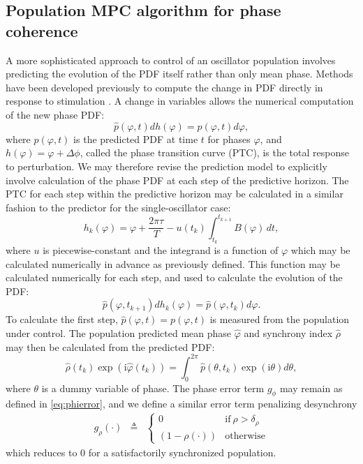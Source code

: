 \subsection*{Population MPC algorithm for phase coherence \label{ssec:popmpc}}
A more sophisticated approach to control of an oscillator population involves predicting the evolution of the PDF itself rather than only mean phase.
Methods have been developed previously to compute the change in PDF directly in response to stimulation \cite{StJohn2014b}.
A change in variables allows the numerical computation of the new phase PDF:
\begin{equation}
    \hat p(\varphi, t)dh(\varphi) = p(\varphi, t)d\varphi,
\end{equation}
where $\hat p(\varphi, t)$ is the predicted PDF at time $t$ for phases $\varphi$, and $h(\varphi) = \varphi + \Delta\phi$, called the phase transition curve (PTC), is the total response to perturbation.
We may therefore revise the prediction model to explicitly involve calculation of the phase PDF at each step of the predictive horizon.
The PTC for each step within the predictive horizon may be calculated in a similar fashion to the predictor for the single-oscillator case:
\begin{equation}
    h_k(\varphi) = \varphi+ \frac{2\pi\tau}{T} -u(t_k) \int_{t_{k}}^{t_{k+1}}B(\varphi)\, dt,
\end{equation}
where $u$ is piecewise-constant and the integrand is a function of $\varphi$ which may be calculated numerically in advance as previously defined.
This function may be calculated numerically for each step, and used to calculate the evolution of the PDF:
\begin{equation}
    \hat p(\varphi, t_{k+1})dh_k(\varphi) = \hat p(\varphi, t_k)d\varphi.
\end{equation}
To calculate the first step, $\hat p(\varphi, t) = p(\varphi, t)$ is measured from the population under control.
The population predicted mean phase $\hat \varphi$ and synchrony index $\hat \rho$ may then be calculated from the predicted PDF:
\begin{equation}
    \hat\rho(t_k)\exp(\mathrm{i}\hat\varphi(t_k)) = \int_0^{2\pi} \hat p(\theta,t_k)\exp(\mathrm{i}\theta)d\theta,
\end{equation}
where $\theta$ is a dummy variable of phase. 
The phase error term $g_\phi$ may remain as defined in \eqref{eq:phierror}, and we define a similar error term penalizing desynchrony
   \begin{eqnarray}
    g_{\rho}(\cdot) & \triangleq &
        \begin{cases}
            0 & \text{if}\ \rho>\delta_\rho\\
            (1-\rho(\cdot)) & \text{otherwise}
        \end{cases}
    \end{eqnarray}
which reduces to 0 for a satisfactorily synchronized population.


